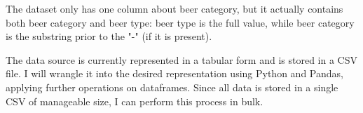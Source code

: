 \documentclass[sigconf, natbib=true]{acmart}
\begin{document}
The \citeauthor{untappd} dataset only has one column about beer category, but it actually contains both beer category and beer type: beer type is the full value, while beer category is the substring prior to the "-" (if it is present).

The \citeauthor{untappd} data source is currently represented in a tabular form and is stored in a CSV file.
I will wrangle it into the desired representation using Python and Pandas, applying further operations on dataframes.
Since all data is stored in a single CSV of manageable size, I can perform this process in bulk.


\end{document}
